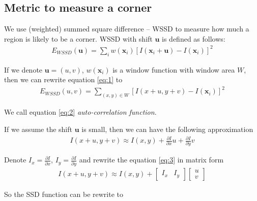 \documentclass[runningheads]{llncs}
\begin{document}
\subsection{Metric to measure a corner}
We use (weighted) summed square difference -- WSSD to
measure how much a region is likely to be a corner.
WSSD with shift $\boldsymbol{u}$ is defined as follows:
\begin{align}
    \label{eq:1}
    E_{WSSD}(\boldsymbol{u}) = \sum_i w(\boldsymbol{x}_i) [I(\boldsymbol{x}_i + \boldsymbol{u}) - I(\boldsymbol{x}_i)]^2
\end{align}
\par
If we denote $\boldsymbol{u} = (u, v)$,
$w(\boldsymbol{x}_i)$ is a window function
with window area $W$,
then we can rewrite equation \ref{eq:1} to
\begin{align}
    \label{eq:2}
    E_{WSSD}(u, v) = \sum_{(x, y) \in W} [I(x + u, y + v) - I(\boldsymbol{x}_i)]^2
\end{align}
\par
We call equation \ref{eq:2} \emph{auto-correlation function}.
\par
If we assume the shift $\boldsymbol{u}$ is small,
then we can have the following approximation
\begin{align}
    \label{eq:3}
    I(x + u, y + v) \approx I(x, y) + \frac{\partial I}{\partial x} u + \frac{\partial I}{\partial y} v  
\end{align}
\par
Denote $I_x = \frac{\partial I}{\partial x}$,
$I_y = \frac{\partial I}{\partial y}$
and rewrite the equation \ref{eq:3} in matrix form
\begin{align}
    \label{eq:4}
    I(x + u, y + v) \approx I(x, y) + 
    \begin{bmatrix}
        I_x &I_y
    \end{bmatrix}
    \begin{bmatrix}
        u \\
        v
    \end{bmatrix}
\end{align}
\par
So the SSD function can be rewrite to 
\end{document}
